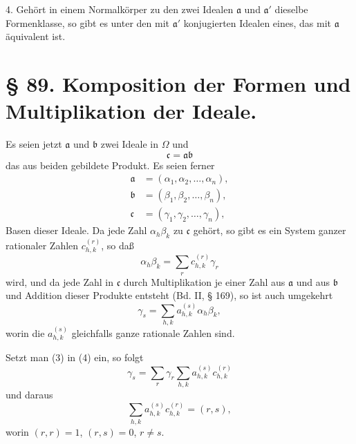 \documentclass[11pt]{article}
\begin{document}
4. Gehört in einem Normalkörper zu den zwei Idealen $\mathfrak a$ und $\mathfrak a'$ dieselbe Formenklasse, so gibt es unter den mit $\mathfrak a'$ konjugierten Idealen eines, das mit $\mathfrak a$ äquivalent ist.

\section*{§ 89. Komposition der Formen und Multiplikation der Ideale.}

Es seien jetzt $\mathfrak a$ und $\mathfrak b$ zwei Ideale in $\Omega$ und
\begin{equation}
 \mathfrak c=\mathfrak a\mathfrak b\tag{1}
\end{equation}
das aus beiden gebildete Produkt. Es seien ferner
\begin{equation}
\begin{aligned}
 \mathfrak a&=(\alpha_1,\alpha_2,\ldots,\alpha_n),\\
 \mathfrak b&=(\beta_1,\beta_2,\ldots,\beta_n),\\
 \mathfrak c&=(\gamma_1,\gamma_2,\ldots,\gamma_n),
\end{aligned}\tag{2}
\end{equation}
Basen dieser Ideale. Da jede Zahl $\alpha_h\beta_k$ zu $\mathfrak c$ gehört, so gibt es ein System ganzer rationaler Zahlen $c_{h,k}^{(r)}$, so daß
\begin{equation}
 \alpha_h\beta_k=\sum_r c_{h,k}^{(r)}\gamma_r\tag{3}
\end{equation}
wird, und da jede Zahl in $\mathfrak c$ durch Multiplikation je einer Zahl aus $\mathfrak a$ und aus $\mathfrak b$ und Addition dieser Produkte entsteht (Bd. II, § 169), so ist auch umgekehrt
\begin{equation}
 \gamma_s=\sum_{h,k} a_{h,k}^{(s)}\alpha_h\beta_k,\tag{4}
\end{equation}
worin die $a_{h,k}^{(s)}$ gleichfalls ganze rationale Zahlen sind.

Setzt man (3) in (4) ein, so folgt
\begin{equation}
 \gamma_s=\sum_r \gamma_r\sum_{h,k}a_{h,k}^{(s)}c_{h,k}^{(r)}\tag{5}
\end{equation}
und daraus
\begin{equation}
 \sum_{h,k}a_{h,k}^{(s)}c_{h,k}^{(r)}=(r,s),\tag{6}
\end{equation}
worin $(r,r)=1$, $(r,s)=0$, $r\ne s$.
\end{document}
